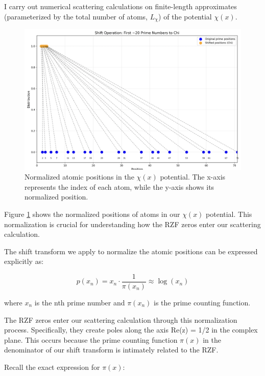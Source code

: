 \documentclass[11pt, oneside]{article}
\begin{document}
I carry out numerical scattering calculations on finite-length approximates (parameterized by the total number of atoms, $L_{\chi}$) of the potential $\chi(x)$.

\begin{figure}[htbp]
\begin{center}
    \includegraphics[width=0.8\linewidth]{../images/normalizing.png}
\caption{Normalized atomic positions in the $\chi(x)$ potential. The x-axis represents the index of each atom, while the y-axis shows its normalized position.}
\label{fig:normalized_positions}
\end{center}
\end{figure}

Figure \ref{fig:normalized_positions} shows the normalized positions of atoms in our $\chi(x)$ potential. This normalization is crucial for understanding how the RZF zeros enter our scattering calculation.


The shift transform we apply to normalize the atomic positions can be expressed explicitly as:

\begin{equation}
p(x_n) = x_n \cdot \frac{1}{\pi(x_n)} \approx \log(x_n)
\end{equation}

where $x_n$ is the nth prime number and $\pi(x_n)$ is the prime counting function.

The RZF zeros enter our scattering calculation through this normalization process. Specifically, they create poles along the axis Re(z) = 1/2 in the complex plane. This occurs because the prime counting function $\pi(x)$ in the denominator of our shift transform is intimately related to the RZF.

Recall the exact expression for $\pi(x)$:
\end{document}
